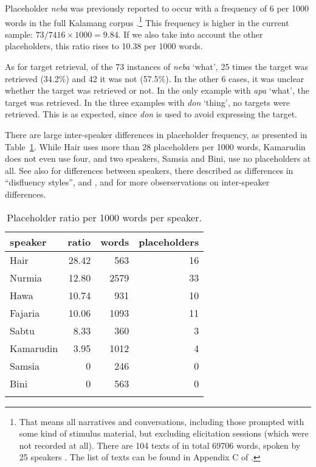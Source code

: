 \documentclass[output=paper,colorlinks,citecolor=brown
\ChapterDOI{10.5281/zenodo.15697587}
]{langscibook}
\begin{document}
Placeholder \textit{neba} was previously reported to occur with a frequency of 6 per 1000 words in the full Kalamang corpus \citep[431]{visser2022}.\footnote{That means all narratives and conversations, including those prompted with some kind of stimulus material, but excluding elicitation sessions (which were not recorded at all). There are 104 texts of in total 69706 words, spoken by 25 speakers \citep[21, 28]{visser2022}. The list of texts can be found in Appendix C of \citet{visser2022}.} This frequency is higher in the current sample: $73/7416\times 1000 = 9.84$. If we also take into account the other placeholders, this ratio rises to 10.38 per 1000 words.

As for target retrieval, of the 73 instances of \textit{neba} `what', 25 times the target was retrieved (34.2\%) and 42 it was not (57.5\%). In the other 6 cases, it was unclear whether the target was retrieved or not. In the only example with \textit{apa} `what', the target was retrieved. In the three examples with \textit{don} `thing', no targets were retrieved. This is as expected, since \textit{don} is used to avoid expressing the target.

There are large inter-speaker differences in placeholder frequency, as presented in Table~\ref{tab:phspk}. While Hair uses more than 28 placeholders per 1000 words, Kamarudin does not even use four, and two speakers, Samsia and Bini, use no placeholders at all. See also \citet{chapters/ponsonnet} for differences between speakers, there described as differences in ``disfluency styles'', and \citet{chapters/pakendorf}, \citet{chapters/ventayol_boada} and \citet{chapters/mcdonnell_billings} for more obserservations on inter-speaker differences.

\begin{table}[ht]
	\caption{Placeholder ratio per 1000 words per speaker.}
	\label{tab:phspk}
		\begin{tabular}{lrrr}
			\lsptoprule
speaker& ratio  & words & placeholders \\
			\midrule
Hair &	28.42 &	563	& 16\\
Nurmia & 12.80 & 2579 & 33\\
Hawa&	10.74&	931	&10\\
Fajaria&	10.06	&1093&	11\\
Sabtu&	8.33&	360&	3\\
Kamarudin&	3.95&	1012&	4\\
Samsia&0&246&0\\
Bini&0&563&0\\\lspbottomrule
		\end{tabular}
\end{table}
\end{document}
